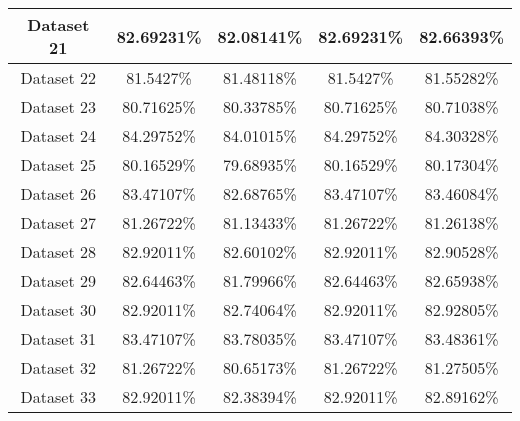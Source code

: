 \begin{center}
\begin{tabular}{ |c||c|c|c|c| }
    \hline
    Dataset 21&82.69231\%&82.08141\%&82.69231\%&82.66393\%\\
    \hline
    Dataset 22&81.5427\%&81.48118\%&81.5427\%&81.55282\%\\
    \hline
    Dataset 23&80.71625\%&80.33785\%&80.71625\%&80.71038\%\\
    \hline
    Dataset 24&84.29752\%&84.01015\%&84.29752\%&84.30328\%\\
    \hline
    Dataset 25&80.16529\%&79.68935\%&80.16529\%&80.17304\%\\
    \hline
    Dataset 26&83.47107\%&82.68765\%&83.47107\%&83.46084\%\\
    \hline
    Dataset 27&81.26722\%&81.13433\%&81.26722\%&81.26138\%\\
    \hline
    Dataset 28&82.92011\%&82.60102\%&82.92011\%&82.90528\%\\
    \hline
    Dataset 29&82.64463\%&81.79966\%&82.64463\%&82.65938\%\\
    \hline
    Dataset 30&82.92011\%&82.74064\%&82.92011\%&82.92805\%\\
    \hline
    Dataset 31&83.47107\%&83.78035\%&83.47107\%&83.48361\%\\
    \hline
    Dataset 32&81.26722\%&80.65173\%&81.26722\%&81.27505\%\\
    \hline
    Dataset 33&82.92011\%&82.38394\%&82.92011\%&82.89162\%\\
    \hline
\end{tabular}
\end{center}

\newpage


